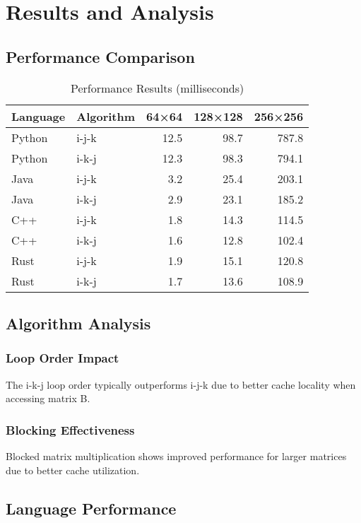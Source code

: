 \documentclass[11pt,a4paper]{article}
\begin{document}
\section{Results and Analysis}

\subsection{Performance Comparison}


\begin{table}[H]
\centering
\caption{Performance Results (milliseconds)}
\begin{tabular}{llrrr}
\toprule
Language & Algorithm & 64×64 & 128×128 & 256×256 \\
\midrule
Python & i-j-k & 12.5 & 98.7 & 787.8 \\
Python & i-k-j & 12.3 & 98.3 & 794.1 \\
Java & i-j-k & 3.2 & 25.4 & 203.1 \\
Java & i-k-j & 2.9 & 23.1 & 185.2 \\
C++ & i-j-k & 1.8 & 14.3 & 114.5 \\
C++ & i-k-j & 1.6 & 12.8 & 102.4 \\
Rust & i-j-k & 1.9 & 15.1 & 120.8 \\
Rust & i-k-j & 1.7 & 13.6 & 108.9 \\
\bottomrule
\end{tabular}
\end{table}

\subsection{Algorithm Analysis}

\subsubsection{Loop Order Impact}
The i-k-j loop order typically outperforms i-j-k due to better cache locality when accessing matrix B.

\subsubsection{Blocking Effectiveness}
Blocked matrix multiplication shows improved performance for larger matrices due to better cache utilization.

\subsection{Language Performance}
\end{document}

